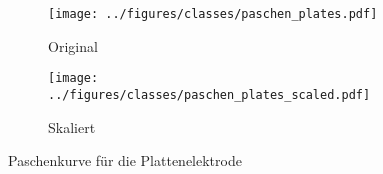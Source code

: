 \begin{figure}[H]
  \centering
  \begin{subfigure}{0.48\textwidth}
    \centering
    \texttt{[image: ../figures/classes/paschen\_plates.pdf]}
    \caption{Original}
  \end{subfigure}
  \hfill
  \begin{subfigure}{0.48\textwidth}
    \centering
    \texttt{[image: ../figures/classes/paschen\_plates\_scaled.pdf]}
    \caption{Skaliert}
  \end{subfigure}
  \caption{Paschenkurve für die Plattenelektrode}
  \label{fig:paschencurveplate}
\end{figure}
